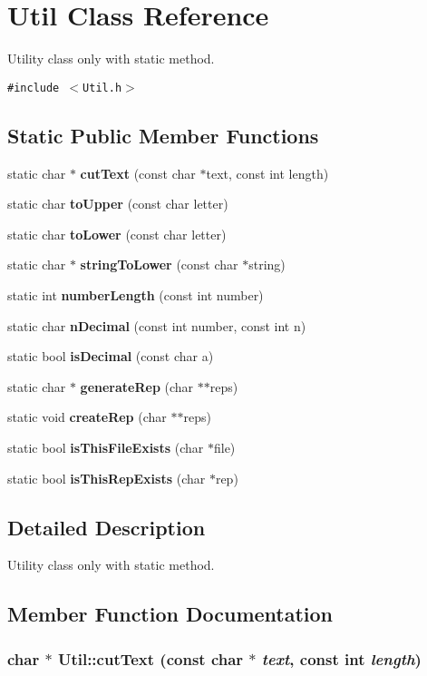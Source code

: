 \section{Util Class Reference}
\label{classUtil}
Utility class only with static method.  


{\tt \#include $<$Util.h$>$}

\subsection*{Static Public Member Functions}
\begin{CompactItemize}
\item 
static char $\ast$ {\bf cutText} (const char $\ast$text, const int length)
\item 
static char {\bf toUpper} (const char letter)
\item 
static char {\bf toLower} (const char letter)
\item 
static char $\ast$ {\bf stringToLower} (const char $\ast$string)
\item 
static int {\bf numberLength} (const int number)
\item 
static char {\bf nDecimal} (const int number, const int n)
\item 
static bool {\bf isDecimal} (const char a)
\item 
static char $\ast$ {\bf generateRep} (char $\ast$$\ast$reps)
\item 
static void {\bf createRep} (char $\ast$$\ast$reps)
\item 
static bool {\bf isThisFileExists} (char $\ast$file)
\item 
static bool {\bf isThisRepExists} (char $\ast$rep)
\end{CompactItemize}


\subsection{Detailed Description}
Utility class only with static method. 

\subsection{Member Function Documentation}
\subsubsection{\setlength{\rightskip}{0pt plus 5cm}char $\ast$ Util::cutText (const char $\ast$ {\em text}, const int {\em length})\hspace{0.3cm}{\tt  [static]}}\label{classUtil_6543bcf3b48e29daf7ce8583ce12f2e4}


